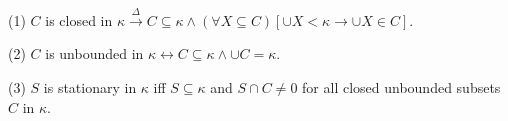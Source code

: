 (1) $C$ is closed in $\kappa \overset{\Delta}{\rightarrow} C \subseteq \kappa \wedge (\forall X \subseteq C)[\cup X < \kappa \rightarrow \cup X \in C]$.

(2) $C$ is unbounded in $\kappa \leftrightarrow C \subseteq \kappa \wedge \cup C = \kappa$.

(3) $S$ is stationary in $\kappa$ iff $S \subseteq \kappa$ and $S \cap C \neq 0$ for all closed unbounded subsets $C$ in $\kappa$.
